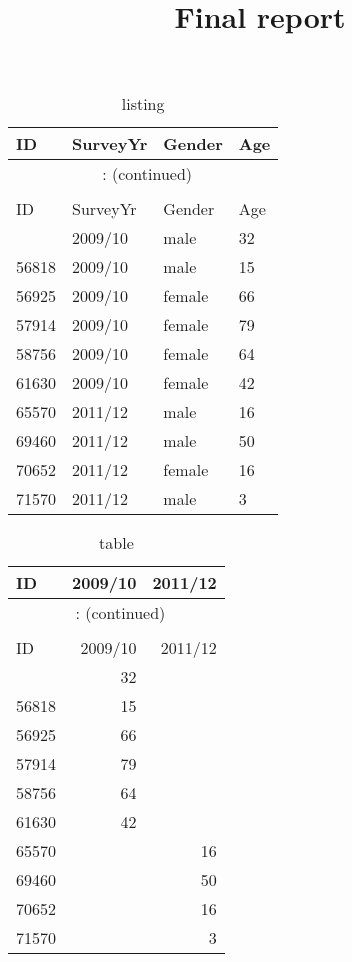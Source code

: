 \documentclass{article}
\title{ Final report }
\begin{document}
\maketitle\clearpage
\listoftables
\newpage
\listoffigures
\newpage
\hypertarget{listing}{} 
\begingroup\footnotesize\begin{longtable}{llll}
\caption{listing}\\
\toprule
ID & SurveyYr & Gender & Age\\
\hline
\endfirsthead
\multicolumn{4}{c}{\tablename~\thetable{}: (continued)}\\\\
\toprule
ID & SurveyYr & Gender & Age\\
\hline
\endhead \hline \endfoot \hline
\endlastfoot
55460 & 2009/10 & male & 32 \\
56818 & 2009/10 & male & 15 \\
56925 & 2009/10 & female & 66 \\
57914 & 2009/10 & female & 79 \\
58756 & 2009/10 & female & 64 \\
61630 & 2009/10 & female & 42 \\
65570 & 2011/12 & male & 16 \\
69460 & 2011/12 & male & 50 \\
70652 & 2011/12 & female & 16 \\
71570 & 2011/12 & male &  3 \\
\end{longtable}

\endgroup
\newpage
\hypertarget{table}{} 
\begingroup\footnotesize\begin{longtable}{lrr}
\caption{table}\\
\toprule
ID & 2009/10 & 2011/12 \\
\hline
\endfirsthead
\multicolumn{3}{c}{\tablename~\thetable{}: (continued)}\\\\
\toprule
ID & 2009/10 & 2011/12 \\
\hline
\endhead \hline \endfoot \hline
\endlastfoot
55460 & 32 &  \\
56818 & 15 &  \\
56925 & 66 &  \\
57914 & 79 &  \\
58756 & 64 &  \\
61630 & 42 &  \\
65570 &  & 16 \\
69460 &  & 50 \\
70652 &  & 16 \\
71570 &  & 3 \\
\end{longtable}
\end{document}
